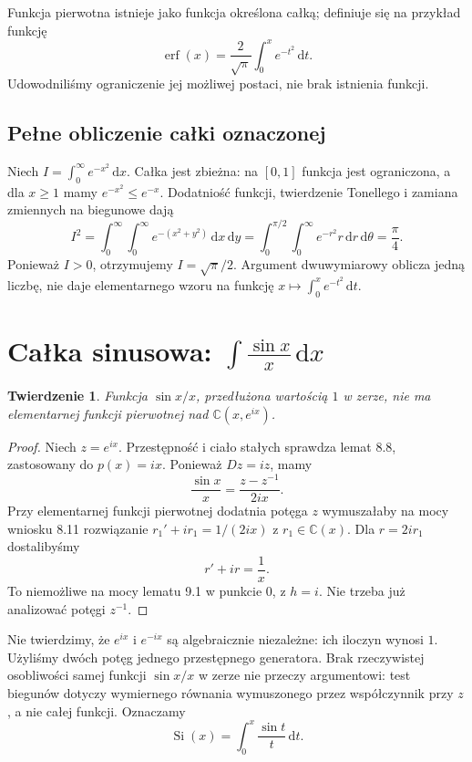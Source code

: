 \documentclass[11pt,a4paper,oneside]{book}
\numberwithin{equation}{section}
\theoremstyle{plain}
\newtheorem{twierdzenie}{Twierdzenie}[chapter]
\theoremstyle{definition}
\theoremstyle{remark}
\newcommand{\C}{\mathbb{C}}
\newcommand{\dd}{\,\mathrm{d}}
\begin{document}
Funkcja pierwotna istnieje jako funkcja określona całką; definiuje się na przykład funkcję
\[
\operatorname{erf}(x)=\frac{2}{\sqrt\pi}\int_0^x e^{-t^2}\dd t.
\]
Udowodniliśmy ograniczenie jej możliwej postaci, nie brak istnienia funkcji.

\subsection{Pełne obliczenie całki oznaczonej}

Niech $I=\int_0^\infty e^{-x^2}\dd x$. Całka jest zbieżna: na $[0,1]$ funkcja jest ograniczona, a dla $x\ge1$ mamy $e^{-x^2}\le e^{-x}$. Dodatniość funkcji, twierdzenie Tonellego i zamiana zmiennych na biegunowe dają
\[
I^2=\int_0^\infty\int_0^\infty e^{-(x^2+y^2)}\dd x\dd y
=\int_0^{\pi/2}\int_0^\infty e^{-r^2}r\dd r\dd\theta
=\frac\pi4.
\]
Ponieważ $I>0$, otrzymujemy $I=\sqrt\pi/2$. Argument dwuwymiarowy oblicza jedną liczbę, nie daje elementarnego wzoru na funkcję $x\mapsto\int_0^x e^{-t^2}\dd t$.

\section{Całka sinusowa: $\int \frac{\sin x}{x}\dd x$}

\begin{twierdzenie}
Funkcja $\sin x/x$, przedłużona wartością $1$ w zerze, nie ma elementarnej funkcji pierwotnej nad $\C(x,e^{ix})$.
\end{twierdzenie}
\begin{proof}
Niech $z=e^{ix}$. Przestępność i ciało stałych sprawdza lemat 8.8, zastosowany do $p(x)=ix$. Ponieważ $Dz=iz$, mamy
\[
\frac{\sin x}{x}=\frac{z-z^{-1}}{2ix}.
\]
Przy elementarnej funkcji pierwotnej dodatnia potęga $z$ wymuszałaby na mocy wniosku 8.11 rozwiązanie $r_1'+ir_1=1/(2ix)$ z $r_1\in\C(x)$. Dla $r=2ir_1$ dostalibyśmy
\[
r'+ir=\frac1x.
\]
To niemożliwe na mocy lematu 9.1 w punkcie $0$, z $h=i$. Nie trzeba już analizować potęgi $z^{-1}$.
\end{proof}

Nie twierdzimy, że $e^{ix}$ i $e^{-ix}$ są algebraicznie niezależne: ich iloczyn wynosi $1$. Użyliśmy dwóch potęg jednego przestępnego generatora. Brak rzeczywistej osobliwości samej funkcji $\sin x/x$ w zerze nie przeczy argumentowi: test biegunów dotyczy wymiernego równania wymuszonego przez współczynnik przy $z$, a nie całej funkcji. Oznaczamy
\[
\operatorname{Si}(x)=\int_0^x\frac{\sin t}{t}\dd t.
\]
\end{document}
